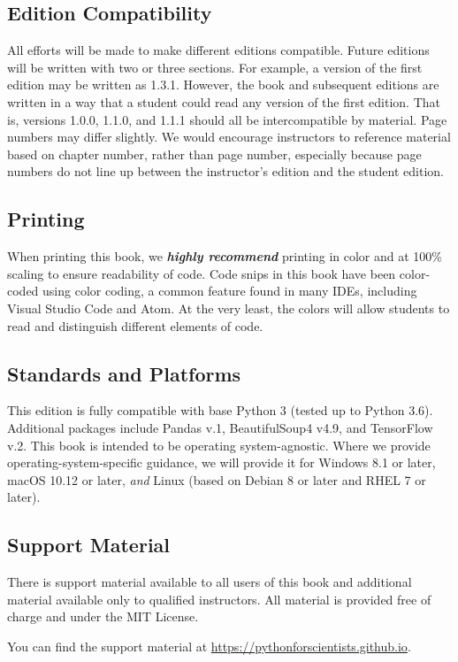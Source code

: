 \subsection*{Edition Compatibility}
All efforts will be made to make different editions compatible. Future editions will be written with two or three sections. For example, a version of the first edition may be written as 1.3.1. However, the book and subsequent editions are written in a way that a student could read any version of the first edition. That is, versions 1.0.0, 1.1.0, and 1.1.1 should all be intercompatible by material. Page numbers may differ slightly. We would encourage instructors to reference material based on chapter number, rather than page number, especially because page numbers do not line up between the instructor's edition and the student edition.\par
\subsection*{Printing}
When printing this book, we \textbf{\textit{highly recommend}} printing in color and at 100\% scaling to ensure readability of code. Code snips in this book have been color-coded using color coding, a common feature found in many IDEs, including Visual Studio Code and Atom. At the very least, the colors will allow students to read and distinguish different elements of code.\par
\subsection*{Standards and Platforms}
This edition is fully compatible with base Python 3 (tested up to Python 3.6). Additional packages include Pandas v.1, BeautifulSoup4 v4.9, and TensorFlow v.2. This book is intended to be operating system-agnostic. Where we provide operating-system-specific guidance, we will provide it for Windows 8.1 or later, macOS 10.12 or later, \textit{and} Linux (based on Debian 8 or later and RHEL 7 or later).
\subsection*{Support Material}
There is support material available to all users of this book and additional material available only to qualified instructors. All material is provided free of charge and under the MIT License.\par
You can find the support material at \href{https://pythonforscientists.github.io}{https://pythonforscientists.github.io}.
